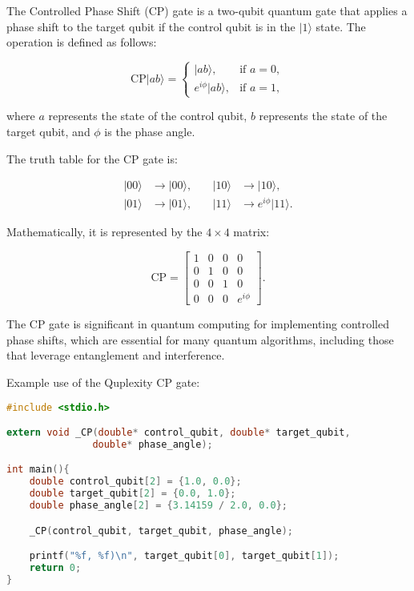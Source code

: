 \documentclass{article}
\begin{document}
The Controlled Phase Shift (CP) gate is a two-qubit quantum gate that applies a phase shift to the target qubit if the control qubit is in the \(|1\rangle\) state. The operation is defined as follows:

\[
\text{CP}|ab\rangle =
\begin{cases}
|ab\rangle, & \text{if } a = 0, \\
e^{i\phi}|ab\rangle, & \text{if } a = 1,
\end{cases}
\]

where \(a\) represents the state of the control qubit, \(b\) represents the state of the target qubit, and \(\phi\) is the phase angle.

The truth table for the CP gate is:

\[
\begin{aligned}
|00\rangle &\to |00\rangle, \quad & |10\rangle &\to |10\rangle, \\
|01\rangle &\to |01\rangle, \quad & |11\rangle &\to e^{i\phi}|11\rangle.
\end{aligned}
\]

Mathematically, it is represented by the \(4 \times 4\) matrix:

\[
\text{CP} = \begin{bmatrix}
1 & 0 & 0 & 0 \\
0 & 1 & 0 & 0 \\
0 & 0 & 1 & 0 \\
0 & 0 & 0 & e^{i\phi}
\end{bmatrix}.
\]

The CP gate is significant in quantum computing for implementing controlled phase shifts, which are essential for many quantum algorithms, including those that leverage entanglement and interference.

Example use of the Quplexity CP gate:

\begin{lstlisting}[language=C, frame=single]
#include <stdio.h>

extern void _CP(double* control_qubit, double* target_qubit, 
               double* phase_angle);

int main(){
    double control_qubit[2] = {1.0, 0.0};
    double target_qubit[2] = {0.0, 1.0};
    double phase_angle[2] = {3.14159 / 2.0, 0.0};

    _CP(control_qubit, target_qubit, phase_angle);

    printf("%f, %f)\n", target_qubit[0], target_qubit[1]);
    return 0;
}
\end{lstlisting}
\end{document}
